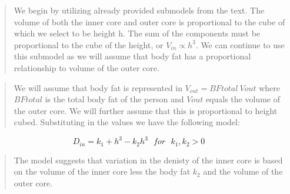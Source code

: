 \documentclass[]{article}
\begin{document}
\begin{quote}
We begin by utilizing already provided submodels from the text. The
volume of both the inner core and outer core is proportional to the cube
of which we select to be height h. The sum of the components must be
proportional to the cube of the height, or \(V_{in} \propto h^3\). We
can continue to use this submodel as we will assume that body fat has a
proportional relationship to volume of the outer core.
\end{quote}

\begin{quote}
We will assume that body fat is represented in
\(V_{out} = BF{total}~V{out}\) where \(BF{total}\) is the total body fat
of the person and \(V{out}\) equals the volume of the outer core. We
will further assume that this is proportional to height cubed.
Substituting in the values we have the following model:
\end{quote}

\[D_{in} = k_1 + h^3 - k_2h^3~~~for~~~k_1, k_2 > 0\]

\begin{quote}
The model suggests that variation in the denisty of the inner core is
based on the volume of the inner core less the body fat \(k_2\) and the
volume of the outer core.
\end{quote}
\end{document}
